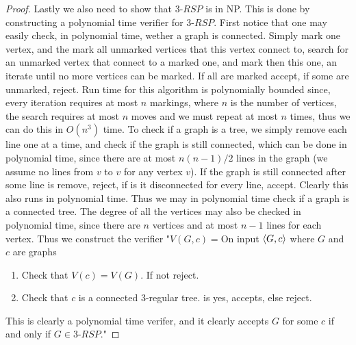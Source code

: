 \documentclass[a4paper,11pt]{article}
\numberwithin{equation}{section}
\begin{document}
\begin{proof}
	Lastly we also need to show that $3\text{-}RSP  $ is in NP. This is done by constructing a polynomial time verifier for $ 3\text{-}RSP $. First notice that one may easily check, in polynomial time, wether a graph is connected. Simply mark one vertex, and the mark all unmarked vertices that this vertex connect to, search for an unmarked vertex that connect to a marked one, and mark then this one, an iterate until no more vertices can be marked. If all are marked accept, if some are unmarked, reject. Run time for this algorithm is polynomially bounded since, every iteration requires at most $ n $ markings, where $ n $ is the number of vertices, the search requires at most $ n $ moves and we must repeat at most $ n $ times, thus we can do this in $ O(n^3) $ time. To check if a graph is a tree, we simply remove each line one at a time, and check if the graph is still connected, which can be done in polynomial time, since there are at most $ n(n-1)/2 $ lines in the graph (we assume no lines from $ v $ to $ v $ for any vertex $ v $). If the graph is still connected after some line is remove, reject, if is it disconnected for every line, accept. Clearly this also runs in polynomial time. Thus we may in polynomial time check if a graph is a connected tree. The degree of all the vertices may also be checked in polynomial time, since there are $ n $ vertices and at most $ n-1 $ lines for each vertex. Thus we construct the verifier "$ V(G,c)= $On input $ \braket{G,c} $ where $ G $ and $ c $ are graphs\begin{enumerate}
		\item Check that $ V(c)=V(G) $. If not reject.\\
		\item Check that $ c $ is a connected 3-regular tree. is yes, accepts, else reject.
	\end{enumerate}
	This is clearly a polynomial time verifer, and it clearly accepts $ G $ for some $ c $ if and only if $ G \in 3\text{-}RSP$."
\end{proof}
\end{document}
